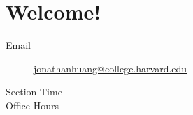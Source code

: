 \documentclass[12pt]{article}
\begin{document}
\header

\section{Welcome!}
\begin{description}

\item[Email] \url{jonathanhuang@college.harvard.edu}

\item[Section Time]

\item[Office Hours]

\end{description}

\section{}
\end{document}
